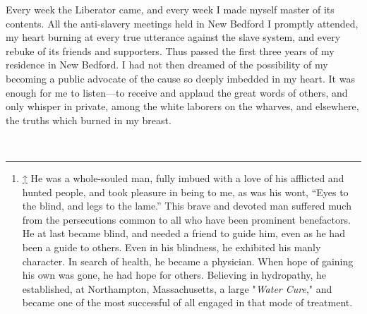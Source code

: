 Every week the Liberator came, and every week I made myself master of
its contents. All the anti-slavery meetings held in New Bedford I
promptly attended, my heart burning at every true utterance against the
slave system, and every rebuke of its friends and supporters. Thus
passed the first three years of my residence in New Bedford. I had not
then dreamed of the possibility of my becoming a public advocate of the
cause so deeply imbedded in my heart. It was enough for me to
listen---to receive and applaud the great words of others, and only
whisper in private, among the white laborers on the wharves, and
elsewhere, the truths which burned in my breast.

~

\begin{center}\rule{0.5\linewidth}{\linethickness}\end{center}

\begin{enumerate}
\item
  \hypertarget{cite_note-1}{}

  {\protect\hyperlink{cite_ref-1}{↑}} {He was a whole-souled man, fully
  imbued with a love of his afflicted and hunted people, and took
  pleasure in being to me, as was his wont, ``Eyes to the blind, and
  legs to the lame.'' This brave and devoted man suffered much from the
  persecutions common to all who have been prominent benefactors. He at
  last became blind, and needed a friend to guide him, even as he had
  been a guide to others. Even in his blindness, he exhibited his manly
  character. In search of health, he became a physician. When hope of
  gaining his own was gone, he had hope for others. Believing in
  hydropathy, he established, at Northampton, Massachusetts, a large
  "\emph{Water Cure}," and became one of the most successful of all
  engaged in that mode of treatment.}
\end{enumerate}
